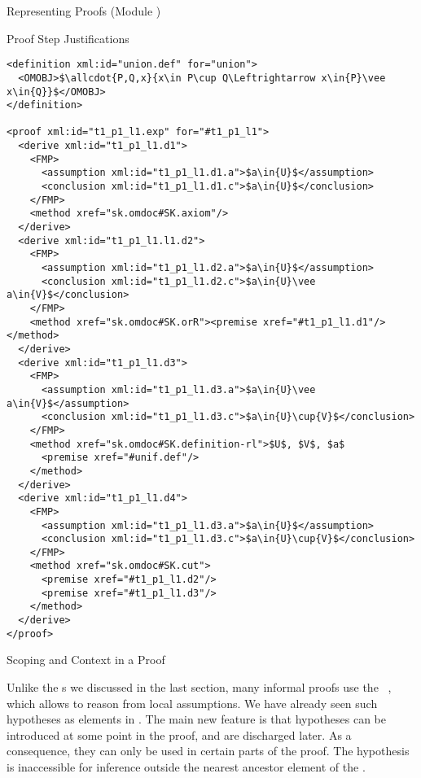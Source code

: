 \begin{tchapter}[id=proofs,short=Representing Proofs]{Representing Proofs (Module {})}
\begin{tsection}[id=proofs:justifications]{Proof Step Justifications}
\begin{lstlisting}[label=lst:expansion2,mathescape,
  caption={An External Expansion of Step {\snippet{t\_1\_p1\_l1}} in {\mylstref{expansion}}},
  index={proof,derive,method,assumption,conclusion}]
<definition xml:id="union.def" for="union">
  <OMOBJ>$\allcdot{P,Q,x}{x\in P\cup Q\Leftrightarrow x\in{P}\vee x\in{Q}}$</OMOBJ>
</definition>

<proof xml:id="t1_p1_l1.exp" for="#t1_p1_l1">
  <derive xml:id="t1_p1_l1.d1">
    <FMP>
      <assumption xml:id="t1_p1_l1.d1.a">$a\in{U}$</assumption>
      <conclusion xml:id="t1_p1_l1.d1.c">$a\in{U}$</conclusion>
    </FMP>
    <method xref="sk.omdoc#SK.axiom"/>
  </derive>
  <derive xml:id="t1_p1_l1.l1.d2">
    <FMP>
      <assumption xml:id="t1_p1_l1.d2.a">$a\in{U}$</assumption>
      <conclusion xml:id="t1_p1_l1.d2.c">$a\in{U}\vee a\in{V}$</conclusion>
    </FMP>
    <method xref="sk.omdoc#SK.orR"><premise xref="#t1_p1_l1.d1"/></method>
  </derive>
  <derive xml:id="t1_p1_l1.d3">
    <FMP>
      <assumption xml:id="t1_p1_l1.d3.a">$a\in{U}\vee a\in{V}$</assumption>
      <conclusion xml:id="t1_p1_l1.d3.c">$a\in{U}\cup{V}$</conclusion>
    </FMP>
    <method xref="sk.omdoc#SK.definition-rl">$U$, $V$, $a$
      <premise xref="#unif.def"/>
    </method>
  </derive>
  <derive xml:id="t1_p1_l1.d4">
    <FMP>
      <assumption xml:id="t1_p1_l1.d3.a">$a\in{U}$</assumption>
      <conclusion xml:id="t1_p1_l1.d3.c">$a\in{U}\cup{V}$</conclusion>
    </FMP>
    <method xref="sk.omdoc#SK.cut">
      <premise xref="#t1_p1_l1.d2"/>
      <premise xref="#t1_p1_l1.d3"/>
    </method>
  </derive>
</proof>          
\end{lstlisting}
\end{tsection}

\begin{tsection}[id=proofs:scoping]{Scoping and Context in a Proof}
  
  Unlike the {s} we discussed in the last section, many
  informal proofs use the
  {}~\cite{Gentzen:uudlsiii35},
  which allows to reason from local assumptions. We have already seen such hypotheses as
  {} elements in {}. The main new feature
  is that hypotheses can be introduced at some point in the proof, and are discharged
  later.  As a consequence, they can only be used in certain parts of the proof.  The
  hypothesis is inaccessible for inference outside the nearest ancestor {}
  element of the {}.
  

\end{tsection}
\end{tchapter}
